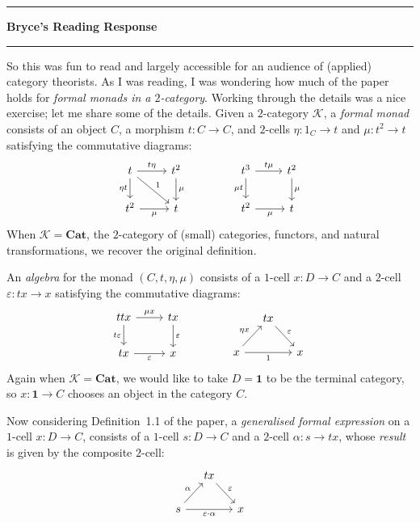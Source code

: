 \documentclass{amsart}
\newcommand{\iam}[1]{
  \vspace{0.25em}
  \hrule
  \vspace{0.25em}
  \textbf{{#1}'s Reading Response}
  \vspace{0.25em}
  \hrule
  \vspace{1em}
}
\begin{document}
\iam{Bryce}
So this was fun to read and largely accessible for an audience of (applied)
category theorists.
As I was reading, I was wondering how much of the paper holds for \emph{formal monads
in a $2$-category}.
Working through the details was a nice exercise; let me share some of the details.
Given a $2$-category $\mathcal{K}$, a \emph{formal monad} consists of an object
$C$, a morphism $t \colon C \rightarrow C$, and $2$-cells
$\eta \colon 1_{C} \rightarrow t$ and $\mu \colon t^{2} \rightarrow t$ satisfying the commutative diagrams:
\begin{equation*}
\begin{tikzcd}
t
\arrow[r, "t \eta"]
\arrow[d, "\eta t"']
\arrow[rd, "1"]
& t^{2}
\arrow[d, "\mu"]
\\
t^{2}
\arrow[r, "\mu"']
& t
\end{tikzcd}
\qquad \qquad
\begin{tikzcd}
t^{3}
\arrow[r, "t \mu"]
\arrow[d, "\mu t"']
& t^{2}
\arrow[d, "\mu"]
\\
t^{2}
\arrow[r, "\mu"']
& t
\end{tikzcd}
\end{equation*}
When $\mathcal{K} = \mathbf{Cat}$, the $2$-category of (small) categories, functors,
and natural transformations, we recover the original definition.

An \emph{algebra} for the monad $(C, t, \eta, \mu)$ consists of a $1$-cell
$x \colon D \rightarrow C$ and a $2$-cell $\varepsilon \colon tx \rightarrow x$
satisfying the commutative diagrams:
\begin{equation*}
\begin{tikzcd}
ttx
\arrow[r, "\mu x"]
\arrow[d, "t \varepsilon"']
& tx
\arrow[d, "\varepsilon"]
\\
tx
\arrow[r, "\varepsilon"']
& x
\end{tikzcd}
\qquad \qquad
\begin{tikzcd}[column sep = small]
& tx
\arrow[rd, "\varepsilon"]
& \\
x
\arrow[ru, "\eta x"]
\arrow[rr, "1"']
& & x
\end{tikzcd}
\end{equation*}
Again when $\mathcal{K} = \mathbf{Cat}$, we would like to take $D = \mathbf{1}$ to be
the terminal category, so $x \colon \mathbf{1} \rightarrow C$ chooses an object in the
category $C$.

Now considering Definition~1.1 of the paper, a \emph{generalised formal expression}
on a $1$-cell $x \colon D \rightarrow C$, consists of a $1$-cell $s \colon D \rightarrow C$ and a $2$-cell $\alpha \colon s \rightarrow tx$, whose
\emph{result} is given by the composite $2$-cell:
\begin{equation*}
\begin{tikzcd}[column sep = small]
& tx
\arrow[rd, "\varepsilon"]
& \\
s
\arrow[ru, "\alpha"]
\arrow[rr, "\varepsilon \cdot \alpha"']
& & x
\end{tikzcd}
\end{equation*}
\end{document}
